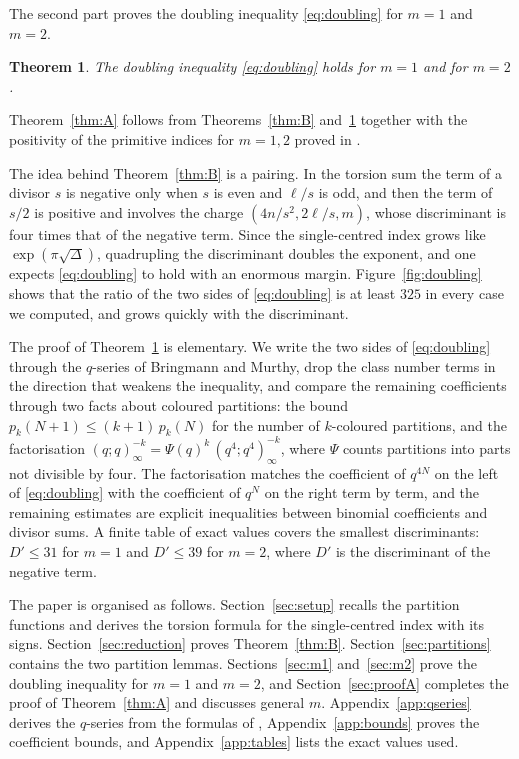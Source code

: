 \documentclass[11pt]{amsart}
\newtheorem{mainthm}{Theorem}
\theoremstyle{definition}
\begin{document}
The second part proves the doubling inequality \eqref{eq:doubling} for $m=1$ and $m=2$.

\begin{mainthm}\label{thm:C}
The doubling inequality \eqref{eq:doubling} holds for $m=1$ and for $m=2$.
\end{mainthm}

Theorem~\ref{thm:A} follows from Theorems~\ref{thm:B} and~\ref{thm:C} together with the positivity of the primitive indices for $m=1,2$ proved in \cite{BM13}.

The idea behind Theorem~\ref{thm:B} is a pairing. In the torsion sum the term of a divisor $s$ is negative only when $s$ is even and $\ell/s$ is odd, and then the term of $s/2$ is positive and involves the charge $(4n/s^2,2\ell/s,m)$, whose discriminant is four times that of the negative term. Since the single-centred index grows like $\exp(\pi\sqrt{\Delta})$, quadrupling the discriminant doubles the exponent, and one expects \eqref{eq:doubling} to hold with an enormous margin. Figure~\ref{fig:doubling} shows that the ratio of the two sides of \eqref{eq:doubling} is at least $325$ in every case we computed, and grows quickly with the discriminant.

The proof of Theorem~\ref{thm:C} is elementary. We write the two sides of \eqref{eq:doubling} through the $q$-series of Bringmann and Murthy, drop the class number terms in the direction that weakens the inequality, and compare the remaining coefficients through two facts about coloured partitions: the bound $p_k(N+1)\le(k+1)\,p_k(N)$ for the number of $k$-coloured partitions, and the factorisation $(q;q)_\infty^{-k}=\Psi(q)^k\,(q^4;q^4)_\infty^{-k}$, where $\Psi$ counts partitions into parts not divisible by four. The factorisation matches the coefficient of $q^{4N}$ on the left of \eqref{eq:doubling} with the coefficient of $q^N$ on the right term by term, and the remaining estimates are explicit inequalities between binomial coefficients and divisor sums. A finite table of exact values covers the smallest discriminants: $D'\le 31$ for $m=1$ and $D'\le 39$ for $m=2$, where $D'$ is the discriminant of the negative term.

The paper is organised as follows. Section~\ref{sec:setup} recalls the partition functions and derives the torsion formula for the single-centred index with its signs. Section~\ref{sec:reduction} proves Theorem~\ref{thm:B}. Section~\ref{sec:partitions} contains the two partition lemmas. Sections~\ref{sec:m1} and~\ref{sec:m2} prove the doubling inequality for $m=1$ and $m=2$, and Section~\ref{sec:proofA} completes the proof of Theorem~\ref{thm:A} and discusses general $m$. Appendix~\ref{app:qseries} derives the $q$-series from the formulas of \cite{BM13}, Appendix~\ref{app:bounds} proves the coefficient bounds, and Appendix~\ref{app:tables} lists the exact values used.
\end{document}
